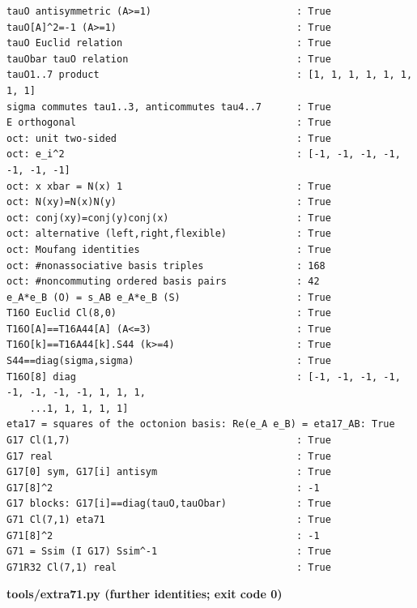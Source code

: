 \documentclass[10pt,a4paper]{article}
\begin{document}
\begin{Verbatim}[fontsize=\small,frame=single,framesep=2mm]
tauO antisymmetric (A>=1)                         : True
tauO[A]^2=-1 (A>=1)                               : True
tauO Euclid relation                              : True
tauObar tauO relation                             : True
tauO1..7 product                                  : [1, 1, 1, 1, 1, 1, 1, 1]
sigma commutes tau1..3, anticommutes tau4..7      : True
E orthogonal                                      : True
oct: unit two-sided                               : True
oct: e_i^2                                        : [-1, -1, -1, -1, -1, -1, -1]
oct: x xbar = N(x) 1                              : True
oct: N(xy)=N(x)N(y)                               : True
oct: conj(xy)=conj(y)conj(x)                      : True
oct: alternative (left,right,flexible)            : True
oct: Moufang identities                           : True
oct: #nonassociative basis triples                : 168
oct: #noncommuting ordered basis pairs            : 42
e_A*e_B (O) = s_AB e_A*e_B (S)                    : True
T16O Euclid Cl(8,0)                               : True
T16O[A]==T16A44[A] (A<=3)                         : True
T16O[k]==T16A44[k].S44 (k>=4)                     : True
S44==diag(sigma,sigma)                            : True
T16O[8] diag                                      : [-1, -1, -1, -1, -1, -1, -1, -1, 1, 1, 1,
    ...1, 1, 1, 1, 1]
eta17 = squares of the octonion basis: Re(e_A e_B) = eta17_AB: True
G17 Cl(1,7)                                       : True
G17 real                                          : True
G17[0] sym, G17[i] antisym                        : True
G17[8]^2                                          : -1
G17 blocks: G17[i]==diag(tauO,tauObar)            : True
G71 Cl(7,1) eta71                                 : True
G71[8]^2                                          : -1
G71 = Ssim (I G17) Ssim^-1                        : True
G71R32 Cl(7,1) real                               : True
\end{Verbatim}
\textbf{tools/extra71.py (further identities; exit code 0)}
\end{document}
